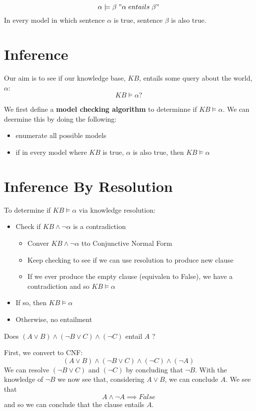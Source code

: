 \begin{definition}[Enatilment]
	\[
		\alpha \models \beta \; "\alpha \; entails \; \beta"
	\]
	In every model in which sentence \(\alpha \) is true, sentence \(\beta \) is also true.
\end{definition}

\section{Inference}
Our aim is to see if our knowledge base, \(KB\), entails some query about the world, \(\alpha\):
\[
	KB \models \alpha ?
\]  

We first define a \textbf{model checking algorithm} to determinne if \(KB \models \alpha \). We can deermine this by doing the following:
\begin{itemize}
	\item enumerate all possible models
	\item if in every model where \(KB\) is true, \(\alpha \) is also true, then \(KB \models \alpha \) 
\end{itemize}

\section{Inference By Resolution}
To determine if \(KB \models \alpha \) via knowledge resolution:
\begin{itemize}
	\item Check if \(KB \land \neg \alpha \) is a contradiction
	\begin{itemize}
		\item Conver \(KB \land \neg \alpha \) tto Conjunctive Normal Form
		\item Keep checking to see if we can use resolution to produce new clause
		\item If we ever produce the empty clause (equivalen to False), we have a contradiction and so \(KB \models \alpha \)
	\end{itemize}
	\item If so, then \(KB \models \alpha \)
	\item Otherwise, no entailment
\end{itemize}

\begin{problem}
	Does \((A \vee B) \land (\neg B \vee C) \land (\neg C)\) entail \(A\) ?
\end{problem}
\begin{answer}
	First, we convert to CNF:
	\[
		(A \vee B) \land (\neg B \vee C) \land (\neg C) \land (\neg A)
	\]
	We can resolve \((\neg B \vee C)\) and \((\neg C)\) by concluding that \(\neg B\). With the knowledge of \(\neg B\) we now see that, considering \(A \vee B\), we can conclude \(A\). We see that
	\[
		A \land \neg A \implies False
	\]
	and so we can conclude that the clause entails \(A\).
\end{answer}